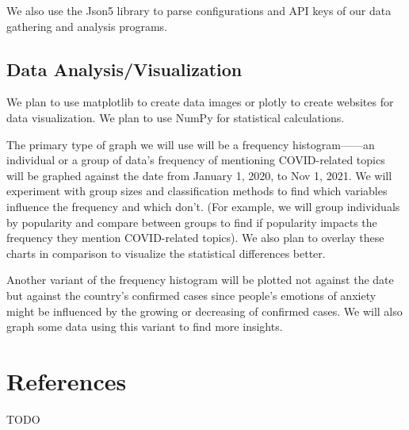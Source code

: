 \documentclass[fontsize=11pt]{article}
\begin{document}
    We also use the Json5 library to parse configurations and API keys of our data gathering and analysis programs.

    \subsection*{Data Analysis/Visualization}

    We plan to use matplotlib to create data images or plotly to create websites for data visualization. We plan to use NumPy for statistical calculations.

    The primary type of graph we will use will be a frequency histogram——an individual or a group of data’s frequency of mentioning COVID-related topics will be graphed against the date from January 1, 2020, to Nov 1, 2021. We will experiment with group sizes and classification methods to find which variables influence the frequency and which don’t. (For example, we will group individuals by popularity and compare between groups to find if popularity impacts the frequency they mention COVID-related topics). We also plan to overlay these charts in comparison to visualize the statistical differences better.

    Another variant of the frequency histogram will be plotted not against the date but against the country’s confirmed cases since people’s emotions of anxiety might be influenced by the growing or decreasing of confirmed cases. We will also graph some data using this variant to find more insights.


    \section*{References}

    TODO

\end{document}

